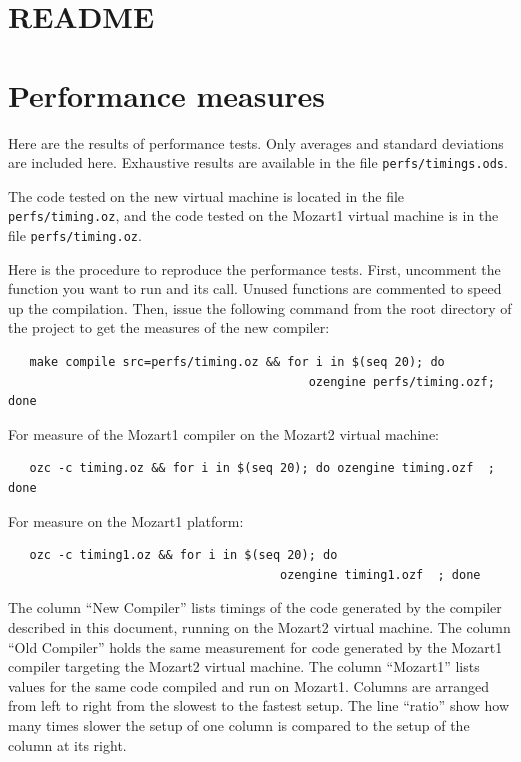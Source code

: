 \documentclass[a4paper]{memoir}
\begin{document}
\begin{appendices}


\chapter{README}\label{appendix:readme}

\chapter{Performance measures}\label{appendix:performance}
Here are the results of performance tests. Only averages and standard deviations are included here.
Exhaustive results are available in the file \lstinline!perfs/timings.ods!.

The code tested on the new virtual machine is located in the file \lstinline!perfs/timing.oz!, and the
code tested on the Mozart1 virtual machine is in the file \lstinline!perfs/timing.oz!.

Here is the procedure to reproduce the performance tests. First, uncomment the function you want to run and its call.
Unused functions are commented to speed up the compilation. Then, issue the following command from the root directory of the project
to get the measures of the new compiler:
\begin{lstlisting}
   make compile src=perfs/timing.oz && for i in $(seq 20); do  
                                          ozengine perfs/timing.ozf; done
\end{lstlisting}
For measure of the Mozart1 compiler on the Mozart2 virtual machine:
\begin{lstlisting}
   ozc -c timing.oz && for i in $(seq 20); do ozengine timing.ozf  ; done 
\end{lstlisting}
For measure on the Mozart1 platform:
\begin{lstlisting}
   ozc -c timing1.oz && for i in $(seq 20); do 
                                      ozengine timing1.ozf  ; done
\end{lstlisting}
The column ``New Compiler'' lists timings of the code generated by the compiler
described in this document, running on the Mozart2 virtual machine. The column ``Old
Compiler'' holds the same measurement for code generated by the Mozart1 compiler
targeting the Mozart2 virtual machine. The column ``Mozart1'' lists values for
the same code compiled and run on Mozart1.
Columns are arranged from left to right from the slowest to the fastest setup.
The line ``ratio'' show how many times slower the setup of one column is
compared to the setup of the column at its right.


\end{appendices}
\end{document}
